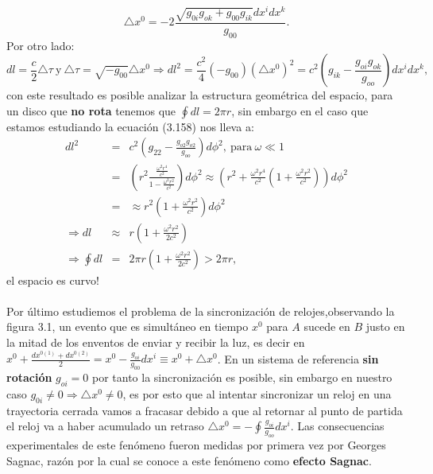 \begin{equation}
\triangle x^0= -2\frac{\sqrt{g_{0i}g_{ok}+g_{00}g_{ik}}dx^{i}dx^{k}}{g_{00}}.
\end{equation}
Por otro lado:
\begin{equation}
dl=\frac{c}{2}\triangle\tau\ \text{y}\ \triangle\tau=\sqrt{-g_{00}}\triangle x^{0}\Rightarrow dl^{2}=\frac{c^{2}}{4}(-g_{00})(\triangle x^{0})^{2}=c^{2}\left(g_{ik}-\frac{g_{oi}g_{ok}}{g_{oo}}\right)dx^{i}dx^{k},
\end{equation}
con este resultado es posible analizar la estructura geométrica del espacio, para un disco que \textbf{no rota} tenemos que $\oint dl=2\pi r$, sin embargo en el caso que estamos estudiando la ecuación (3.158) nos lleva a:
\begin{eqnarray}
\nonumber dl^{2}&=&c^{2}\left(g_{22}-\frac{g_{o2}g_{o2}}{g_{oo}}\right)d\phi^{2},\ \text{para}\ \omega\ll 1\\
\nonumber &=& \left(r^{2}\frac{\frac{\omega^{2}r^{4}}{c^{2}}}{1-\frac{\omega^{2}r^{2}}{c^{2}}}\right)d\phi^{2}\approx \left(r^{2}+\frac{\omega^{2}r^{4}}{c^{2}}\left(1+\frac{\omega^{2}r^{2}}{c^{2}}\right)\right)d\phi^{2}\\
\nonumber &=& \approx r^{2}\left(1+\frac{\omega^{2}r^{2}}{c^{2}}\right)d\phi^{2}\\
\nonumber \Rightarrow dl &\approx &r \left(1+\frac{\omega^{2}r^{2}}{2c^{2}}\right)\\
\Rightarrow\oint dl&=& 2\pi r\left(1+\frac{\omega^{2}r^{2}}{2c^{2}}\right)>2\pi r,
\end{eqnarray}
el espacio es curvo!
\\
\\
Por último estudiemos el problema de la sincronización de relojes,observando la figura 3.1, un evento que es simultáneo en tiempo $x^0$ para $A$ sucede en $B$ justo en la mitad de los enventos de enviar y recibir la luz, es decir en $x^{0}+\frac{dx^{0(1)}+dx^{0(2)}}{2}=x^{0}-\frac{g_{oi}}{g_{00}}dx^{i}\equiv x^{0}+\triangle x^{0}$. En un sistema de referencia \textbf{sin rotación} $g_{oi}=0$ por tanto la sincronización es posible, sin embargo en nuestro caso $g_{0i}\neq 0\Rightarrow \triangle x^0\neq 0$, es por esto que al intentar sincronizar un reloj en una trayectoria cerrada vamos a fracasar debido a que al retornar al punto de partida el reloj 	va a haber acumulado un retraso $\triangle x^{0}=-\oint\frac{g_{oi}}{g_{oo}}dx^{i}$. Las consecuencias experimentales de este fenómeno fueron medidas por primera vez por Georges Sagnac, razón por la cual se conoce a este fenómeno como    \textbf{efecto Sagnac}.
